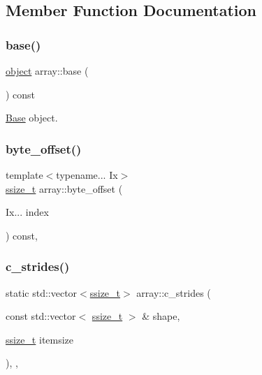 \subsection{Member Function Documentation}
\mbox{\label{classarray_a33a2f2933da6ca35a8ac82709df90038}} 
\subsubsection{\texorpdfstring{base()}{base()}}
{\footnotesize\ttfamily \mbox{\hyperlink{classobject}{object}} array\+::base (\begin{DoxyParamCaption}{ }\end{DoxyParamCaption}) const\hspace{0.3cm}{\ttfamily [inline]}}



\mbox{\hyperlink{struct_base}{Base}} object. 

\mbox{\label{classarray_a336f1f7f56775fa328587645f2ab6e6f}} 
\subsubsection{\texorpdfstring{byte\_offset()}{byte\_offset()}}
{\footnotesize\ttfamily template$<$typename... Ix$>$ \\
\mbox{\hyperlink{detail_2common_8h_ac430d16fc097b3bf0a7469cfd09decda}{ssize\+\_\+t}} array\+::byte\+\_\+offset (\begin{DoxyParamCaption}\item[{Ix...}]{index }\end{DoxyParamCaption}) const\hspace{0.3cm}{\ttfamily [inline]}, {\ttfamily [protected]}}

\mbox{\label{classarray_acbcef933c85e97ffafa7f9b2114ffef4}} 
\subsubsection{\texorpdfstring{c\_strides()}{c\_strides()}}
{\footnotesize\ttfamily static std\+::vector$<$\mbox{\hyperlink{detail_2common_8h_ac430d16fc097b3bf0a7469cfd09decda}{ssize\+\_\+t}}$>$ array\+::c\+\_\+strides (\begin{DoxyParamCaption}\item[{const std\+::vector$<$ \mbox{\hyperlink{detail_2common_8h_ac430d16fc097b3bf0a7469cfd09decda}{ssize\+\_\+t}} $>$ \&}]{shape,  }\item[{\mbox{\hyperlink{detail_2common_8h_ac430d16fc097b3bf0a7469cfd09decda}{ssize\+\_\+t}}}]{itemsize }\end{DoxyParamCaption})\hspace{0.3cm}{\ttfamily [inline]}, {\ttfamily [static]}, {\ttfamily [protected]}}

